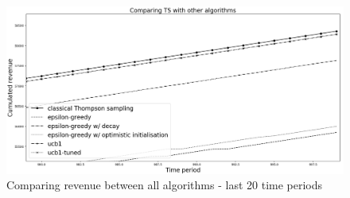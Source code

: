 \documentclass[a4paper]{article}
\begin{document}
\begin{figure}[h]
	\centering
	\includegraphics[width=1\textwidth]{Figure_1-4.png}
	\caption{\label{fig:three}Comparing revenue between all algorithms - last 20 time periods}
\end{figure}
\pagebreak
\end{document}
